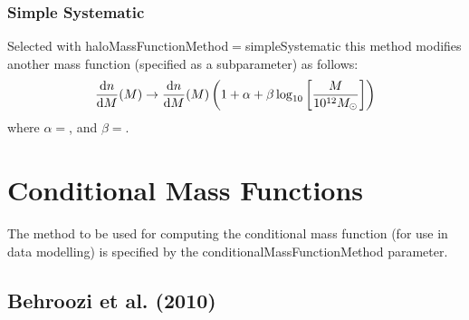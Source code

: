 \subsubsection{Simple Systematic}\label{phys:haloMassFunction:haloMassFunctionSimpleSystematic}                                               
                                                                                                                                              
Selected with {\normalfont \ttfamily haloMassFunctionMethod}$=${\normalfont \ttfamily simpleSystematic} this method modifies another mass function (specified as a subparameter) as follows:
\begin{equation}
  {{\rm d} n\over {\rm d}M}(M) \rightarrow {{\rm d} n\over {\rm d}M}(M) \left( 1 + \alpha + \beta \log_{10}\left[ {M \over 10^{12}M_\odot} \right] \right)
\end{equation}
where $\alpha=${\normalfont \ttfamily [alpha]}, and $\beta=${\normalfont \ttfamily [beta]}.

\section{Conditional Mass Functions}

The method to be used for computing the conditional mass function (for use in data modelling) is specified by the {\normalfont \ttfamily conditionalMassFunctionMethod} parameter.

\subsection{Behroozi et al. (2010)}\label{phys:conditionalMassFunction:conditionalMassFunctionBehroozi2010}


